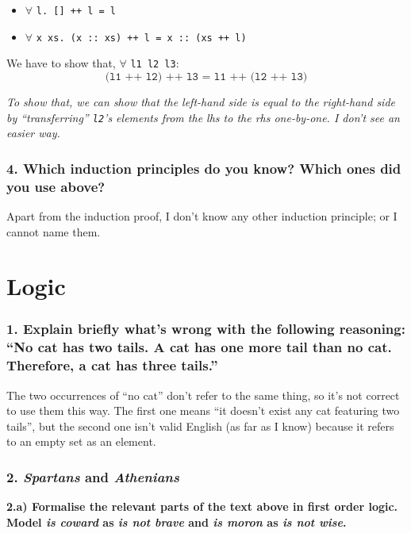 \documentclass[10pt,a4paper]{article}
\begin{document}
\begin{itemize}
\item $\forall$ \texttt{l. [] ++ l = l}
\item $\forall$ \texttt{x xs. (x~::~xs) ++ l = x~::~(xs ++ l)}
\end{itemize}

We have to show that, $\forall$ \texttt{l1 l2 l3}:
\begin{equation}
\texttt{(l1 ++ l2) ++ l3 = l1 ++ (l2 ++ l3)}
\end{equation}

\textit{To show that, we can show that the left-hand side is equal to the right-hand side by ``transferring'' \texttt{l2}'s elements from the lhs to the rhs one-by-one. I don't see an easier way.}

\subsubsection*{4. Which induction principles do you know? Which ones did you use above?}

Apart from the induction proof, I don't know any other induction principle; or I cannot name them.

\section{Logic}

\subsubsection*{1. Explain briefly what's wrong with the following reasoning: ``No cat has two tails. A cat has one more tail than no cat. Therefore, a cat has three tails.''}

The two occurrences of ``no cat'' don't refer to the same thing, so it's not correct to use them this way. The first one means ``it doesn't exist any cat featuring two tails'', but the second one isn't valid English (as far as I know) because it refers to an empty set as an element.

\subsubsection*{2. \textit{Spartans} and \textit{Athenians}}

\textbf{2.a) Formalise the relevant parts of the text above in first order logic. Model \textit{is coward} as \textit{is not brave} and \textit{is moron} as \textit{is not wise}.}\\
\end{document}
